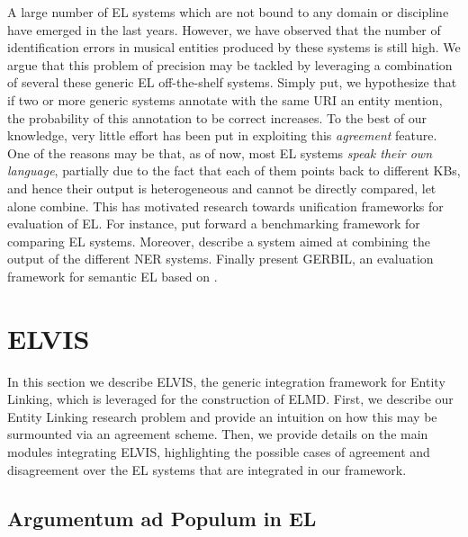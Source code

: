 A large number of \textsc{EL} systems which are not bound to any domain or discipline have emerged in the last years. However, we have observed that the number of identification errors in musical entities produced by these systems is still high. We argue that this problem of precision may be tackled by leveraging a combination of several these generic EL off-the-shelf systems. Simply put, we hypothesize that if two or more generic systems annotate with the same URI an entity mention, the probability of this annotation to be correct increases. To the best of our knowledge, very little effort has been put in exploiting this \textit{agreement} feature. One of the reasons may be that, as of now, most EL systems \textit{speak their own language}, partially due to the fact that each of them points back to different KBs, and hence their output is heterogeneous and cannot be directly compared, let alone combine. This has motivated research towards unification frameworks for evaluation of EL. For instance, \cite{Cornolti2013} put forward a benchmarking framework for comparing EL systems. Moreover, \cite{Rizzo2014} describe a system aimed at combining the output of the different NER systems. Finally \cite{Usbeck2015} present \textsc{GERBIL}, an evaluation framework for semantic EL based on \cite{Cornolti2013}. %



\section{ELVIS}
\label{sec:linking:elvis}

In this section we describe \textsc{ELVIS}, the generic integration framework for Entity Linking, which is leveraged for the construction of \textsc{ELMD}. First, we describe our Entity Linking research problem and provide an intuition on how this may be surmounted via an agreement scheme. Then, we provide details on the main modules integrating \textsc{ELVIS}, highlighting the possible cases of agreement and disagreement over the EL systems that are integrated in our framework.

\subsection{Argumentum ad Populum in EL}
\label{sec:linking:agreement}

